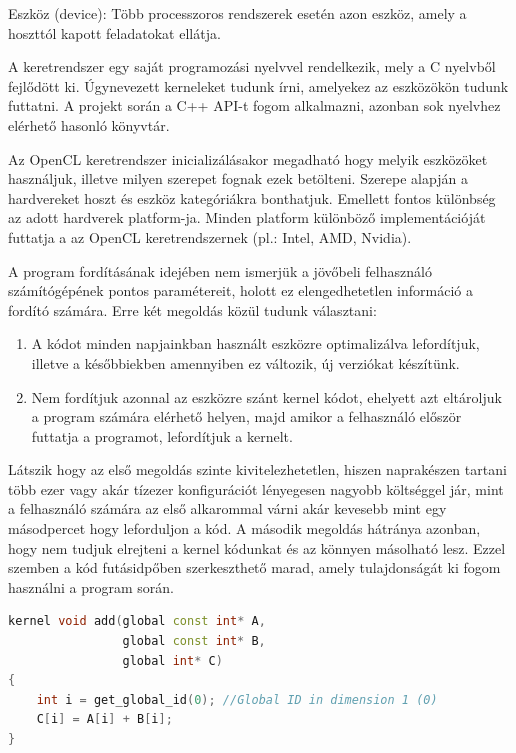 \begin{definition}
Eszköz (device): Több processzoros rendszerek esetén azon eszköz, amely a hoszttól kapott feladatokat ellátja.
\end{definition}


A keretrendszer egy saját programozási nyelvvel rendelkezik, mely a C nyelvből fejlődött ki. Úgynevezett kerneleket tudunk írni, amelyekez az eszközökön tudunk futtatni. A projekt során a C++ API-t fogom alkalmazni, azonban sok nyelvhez elérhető hasonló könyvtár.

Az OpenCL keretrendszer inicializálásakor megadható hogy melyik eszközöket használjuk, illetve milyen szerepet fognak ezek betölteni. Szerepe alapján a hardvereket hoszt és eszköz kategóriákra bonthatjuk. Emellett fontos különbség az adott hardverek platform-ja. Minden platform különböző implementációját futtatja a az OpenCL keretrendszernek (pl.: Intel, AMD, Nvidia).

A program fordításának idejében nem ismerjük a jövőbeli felhasználó számítógépének pontos paramétereit, holott ez elengedhetetlen információ a fordító számára. Erre két megoldás közül tudunk választani:


\begin{enumerate}
  \item A kódot minden napjainkban használt eszközre optimalizálva lefordítjuk, illetve a későbbiekben amennyiben ez változik, új verziókat készítünk.
  \item Nem fordítjuk azonnal az eszközre szánt kernel kódot, ehelyett azt eltároljuk a program számára elérhető helyen, majd amikor a felhasználó először futtatja a programot, lefordítjuk a kernelt.
\end{enumerate}


Látszik hogy az első megoldás szinte kivitelezhetetlen, hiszen naprakészen tartani több ezer vagy akár tízezer konfigurációt lényegesen nagyobb költséggel jár, mint a felhasználó számára az első alkarommal várni akár kevesebb mint egy másodpercet hogy leforduljon a kód. A második megoldás hátránya azonban, hogy nem tudjuk elrejteni a kernel kódunkat és az könnyen másolható lesz. Ezzel szemben a kód futásidpőben szerkeszthető marad, amely tulajdonságát ki fogom használni a program során.


\begin{lstlisting}[language={C++}]
kernel void add(global const int* A,
                global const int* B,
                global int* C)
{ 
    int i = get_global_id(0); //Global ID in dimension 1 (0)
    C[i] = A[i] + B[i]; 
}
\end{lstlisting}



